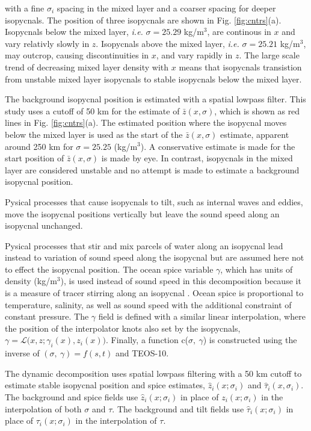 \documentclass[preprint]{JASA}
\begin{document}
with a fine $\sigma_i$ spacing in the mixed layer and a coarser spacing for deeper isopycnals. The position of three isopycnals are shown in Fig. \ref{fig:cntrs}(a). Isopycnals below the mixed layer, \emph{i.e.} $\sigma = 25.29$ kg/m$^3$, are continous in $x$ and vary relativly slowly in $z$. Isopycnals above the mixed layer, \emph{i.e.} $\sigma = 25.21$ kg/m$^3$, may outcrop, causing discontinuities in $x$, and vary rapidly in $z$. The large scale trend of decreasing mixed layer density with $x$ means that isopycnals transistion from unstable mixed layer isopycnals to stable isopycnals below the mixed layer.


 The background isopycnal position is estimated with a spatial lowpass filter. This study uses a cutoff of 50 km for the estimate of $\bar{z}(x, \sigma)$, which is shown as red lines in Fig. \ref{fig:cntrs}(a). The estimated position where the isopycnal moves below the mixed layer is used as the start of the $\bar{z}(x, \sigma)$ estimate, apparent around 250 km for $\sigma=25.25$ (kg/m$^3$). A conservative estimate is made for the start position of $\bar{z}(x, \sigma)$ is made by eye. In contrast, isopycnals in the mixed layer are considered unstable and no attempt is made to estimate a background isopycnal position.

 Pysical processes that cause isopycnals to tilt, such as internal waves and eddies, move the isopycnal positions vertically but leave the sound speed along an isopycnal unchanged.

Pysical processes that stir and mix parcels of water along an isopycnal lead instead to variation of sound speed along the isopycnal but are assumed here not to effect the isopycnal position. The ocean spice variable $\gamma$, which has units of density (kg/m$^3$), is used instead of sound speed in this decomposition because it is a measure of tracer stirring along an isopycnal \cite{veronis1972properties}. Ocean spice is proportional to temperature, salinity, as well as sound speed with the additional constraint of constant pressure. The $\gamma$ field is defined with a similar linear interpolation, where the position of the interpolator knots also set by the isopycnals, $\gamma = \mathcal{L}\big(x, z; \gamma_i(x), z_i(x)\big)$. Finally, a function c($\sigma, \ \gamma$) is constructed using the inverse of $(\sigma, \ \gamma) = f(s, t)$ and TEOS-10.

The dynamic decomposition uses spatial lowpass filtering with a 50 km cutoff to estimate stable isopycnal position and spice estimates, $\hat{z}_i(x; \sigma_i)$ and $\hat{\tau}_i(x, \sigma_i)$. The background and spice fields use $\hat{z}_i(x; \sigma_i)$ in place of $z_i(x; \sigma_i)$ in the interpolation of both $\sigma$ and $\tau$. The background and tilt fields use $\hat{\tau}_i(x; \sigma_i)$ in place of $\tau_i(x; \sigma_i)$ in the interpolation of $\tau$.
\end{document}
